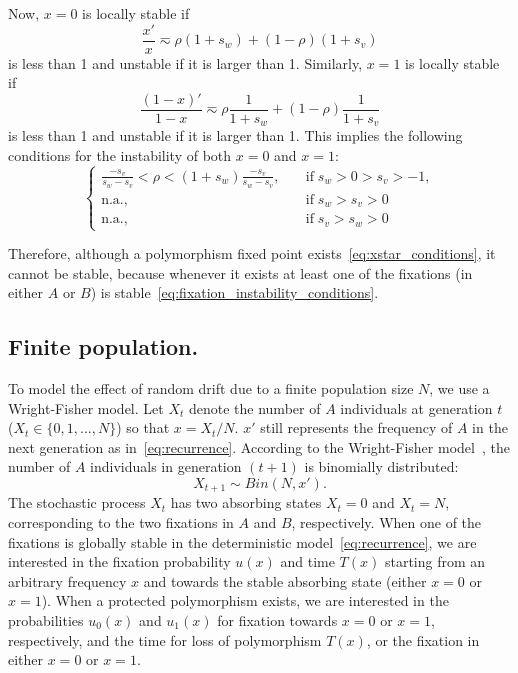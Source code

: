 \documentclass[14pt]{extarticle}
\begin{document}
Now, $x=0$ is locally stable if 
\begin{equation}
\frac{x'}{x} \eqsim 
\rho (1+s_w) + (1-\rho) (1+s_v)
\end{equation}
is less than 1 and unstable if it is larger than 1.
Similarly, $x=1$ is locally stable if 
\begin{equation}
\frac{(1-x)'}{1-x} \eqsim 
\rho \frac{1}{1+s_w} + (1-\rho) \frac{1}{1+s_v}
\end{equation}
is less than 1 and unstable if it is larger than 1.
This implies the following conditions for the instability of both $x=0$ and $x=1$:
\begin{equation} \label{eq:fixation_instability_conditions}
\begin{cases}
\frac{-s_v}{s_w - s_v} < \rho < (1+s_w) \frac{-s_v}{s_w - s_v},& \quad \text{if}\; s_w > 0 > s_v > -1,\\
\text{n.a.},& \quad \text{if}\; s_w > s_v > 0 \\
\text{n.a.},& \quad \text{if}\; s_v > s_w > 0
\end{cases}
\end{equation}
 
Therefore, although a polymorphism fixed point exists~\eqref{eq:xstar_conditions}, it cannot be stable, because whenever it exists at least one of the fixations (in either $A$ or $B$) is stable~\eqref{eq:fixation_instability_conditions}.


\subsection*{Finite population.}
To model the effect of random drift due to a finite population size $N$, we use a Wright-Fisher model.
Let $X_t$ denote the number of $A$ individuals at generation $t$ ($X_t \in \{0, 1, \ldots, N\}$) so that $x=X_t/N$.
$x'$ still represents the frequency of $A$ in the next generation as in~\eqref{eq:recurrence}.
According to the Wright-Fisher model~\citep{Ewens2004}, the number of $A$ individuals in generation $(t+1)$ is binomially distributed:
\begin{equation}
X_{t+1} \sim Bin(N, x').
\end{equation}
The stochastic process $X_t$ has two absorbing states $X_t=0$ and $X_t=N$, corresponding to the two fixations in $A$ and $B$, respectively.
When one of the fixations is globally stable in the deterministic model~\eqref{eq:recurrence}, we are interested in the fixation probability $u(x)$ and time $T(x)$ starting from an arbitrary frequency $x$ and towards the stable absorbing state (either $x=0$ or $x=1$).
When a protected polymorphism exists, we are interested in the probabilities $u_0(x)$ and $u_1(x)$ for fixation towards $x=0$ or $x=1$, respectively, and the time for loss of polymorphism $T(x)$, or the fixation in either $x=0$ or $x=1$.
\end{document}
